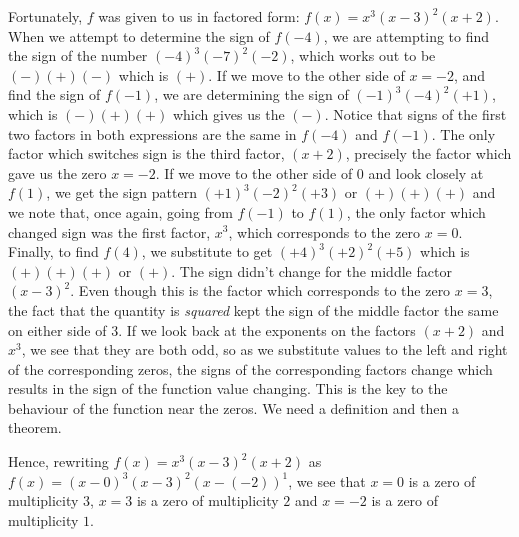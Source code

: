 Fortunately, $f$ was given to us in factored form:  $f(x) = x^3 (x-3)^2 (x+2)$.  When we attempt to determine the sign of $f(-4)$, we are attempting to find the sign of the number $(-4)^3 (-7)^2 (-2)$, which works out to be $(-)(+)(-)$ which is $(+)$.  If we move to the other side of $x=-2$, and find the sign of $f(-1)$, we are determining the sign of  $(-1)^3 (-4)^2 (+1)$, which is $(-)(+)(+)$ which gives us the $(-)$.  Notice that signs of the first two factors in both expressions are the same in $f(-4)$ and $f(-1)$.  The only factor which switches sign is the third factor, $(x+2)$, precisely the factor which gave us the zero $x=-2$.  If we move to the other side of $0$ and look closely at $f(1)$, we get the sign pattern $(+1)^3(-2)^2(+3)$ or $(+)(+)(+)$ and we note that, once again, going from $f(-1)$ to $f(1)$, the only factor which changed sign was the first factor, $x^3$, which corresponds to the zero $x=0$.  Finally, to find $f(4)$, we substitute to get $(+4)^3(+2)^2(+5)$ which is $(+)(+)(+)$ or $(+)$.  The sign didn't change for the middle factor $(x-3)^2$.  Even though this is the factor which corresponds to the zero $x=3$, the fact that the quantity is \textit{squared} kept the sign of the middle factor the same on either side of $3$.  If we look back at the exponents on the factors $(x+2)$ and $x^3$, we see that they are both odd, so as we substitute values to the left and right of the corresponding zeros, the signs of the corresponding factors change which results in the sign of the function value changing.  This is the key to the behaviour of the function near the zeros.  We need a definition and then a theorem.

\smallskip


\smallskip

Hence,  rewriting  $f(x) = x^3 (x-3)^2 (x+2)$ as $f(x) = (x-0)^3 (x-3)^2 (x-(-2))^{1}$, we see that $x=0$ is a zero of multiplicity $3$, $x=3$ is a zero of multiplicity $2$ and $x=-2$ is a zero of multiplicity $1$.

\smallskip


